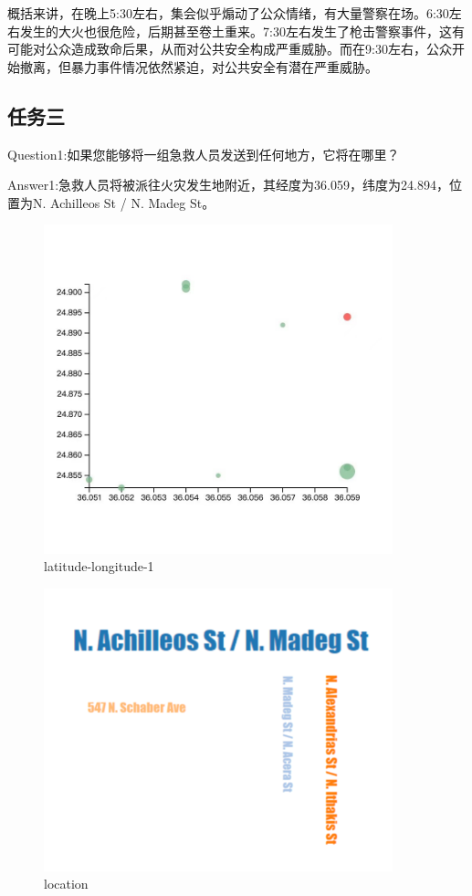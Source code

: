 \documentclass[a4paper]{article}
\begin{document}
概括来讲，在晚上5:30左右，集会似乎煽动了公众情绪，有大量警察在场。6:30左右发生的大火也很危险，后期甚至卷土重来。7:30左右发生了枪击警察事件，这有可能对公众造成致命后果，从而对公共安全构成严重威胁。而在9:30左右，公众开始撤离，但暴力事件情况依然紧迫，对公共安全有潜在严重威胁。
\subsection{任务三}
Question1:如果您能够将一组急救人员发送到任何地方，它将在哪里？

Answer1:急救人员将被派往火灾发生地附近，其经度为36.059，纬度为24.894，位置为N. Achilleos St / N. Madeg St。

\begin{figure}[H]
  \centering
  \includegraphics[width=0.9\textwidth]{images/3-1}
  \caption{latitude-longitude-1}\label{fig:3-1}
  \vspace{\baselineskip}
\end{figure}

\begin{figure}[H]
  \centering
  \includegraphics[width=0.9\textwidth]{images/3-2.png}
  \caption{location}\label{fig:3-2}
  \vspace{\baselineskip}
\end{figure}
\end{document}
